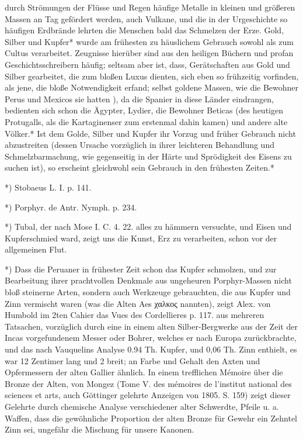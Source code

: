 \documentclass[a4paper, 11pt, oneside, polutonikogreek, german]{article}
\begin{document}
durch Strömungen der Flüsse und Regen häufige Metalle in kleinen und größeren Massen an Tag gefördert werden, auch Vulkane, und die in der Urgeschichte so häufigen Erdbrände lehrten die Menschen bald das Schmelzen der Erze. Gold, Silber und Kupfer* wurde am frühesten zu häuslichem Gebrauch sowohl als zum Cultus verarbeitet. Zeugnisse hierüber sind aus den heiligen Büchern und profan Geschichtsschreibern häufig; seltsam aber ist, dass, Gerätschaften aus Gold und Silber gearbeitet, die zum bloßen Luxus dienten, sich eben so frühzeitig vorfinden, als jene, die bloße Notwendigkeit erfand; selbst goldene Massen, wie die Bewohner Perus und Mexicos sie hatten ), da die Spanier in diese Länder eindrangen, bedienten sich schon die Ägypter, Lydier, die Bewohner Beticas (des heutigen Protugalls, als die Kartaginenser zum erstenmal dahin kamen) und andere alte Völker.* Ist dem Golde, Silber und Kupfer ihr Vorzug und früher Gebrauch nicht abzustreiten (dessen Ursache vorzüglich in ihrer leichteren Behandlung und Schmelzbarmachung, wie gegenseitig in der Härte und Sprödigkeit des Eisens zu suchen ist), so erscheint gleichwohl sein Gebrauch in den frühesten Zeiten.*

*) Stobaeus L. I. p. 141.

*) Porphyr. de Antr. Nymph. p. 234.

*) Tubal, der nach Mose I. C. 4. 22. alles zu hämmern versuchte, und Eisen und Kupferschmied ward, zeigt uns die Kunst, Erz zu verarbeiten, schon vor der allgemeinen Flut.

*) Dass die Peruaner in frühester Zeit schon das Kupfer schmolzen, und zur Bearbeitung ihrer prachtvollen Denkmale aus ungeheuren Porphyr-Massen nicht bloß steinerne Arten, sondern auch Werkzeuge gebrauchten, die aus Kupfer und Zinn vermischt waren (was die Alten Aes χαλκος nannten), zeigt Alex. von Humbold im 2ten Cahier das Vues des Cordellieres p. 117. aus mehreren Tatsachen, vorzüglich durch eine in einem alten Silber-Bergwerke aus der Zeit der Incas vorgefundenem Messer oder Bohrer, welches er nach Europa zurückbrachte, und das nach Vauquelins Analyse 0.94 Th. Kupfer, und 0,06 Th. Zinn enthielt, es war 12 Zentimer lang und 2 breit; an Farbe und Gehalt den Axten und Opfermessern der alten Gallier ähnlich. In einem trefflichen Mémoire über die Bronze der Alten, von Mongez (Tome V. des mémoires de l'institut national des sciences et arts, auch Göttinger gelehrte Anzeigen von 1805. S. 159) zeigt dieser Gelehrte durch chemische Analyse verschiedener alter Schwerdte, Pfeile u. a. Waffen, dass die gewöhnliche Proportion der alten Bronze für Gewehr ein Zehntel Zinn sei, ungefähr die Mischung für unsere Kanonen.
\end{document}
